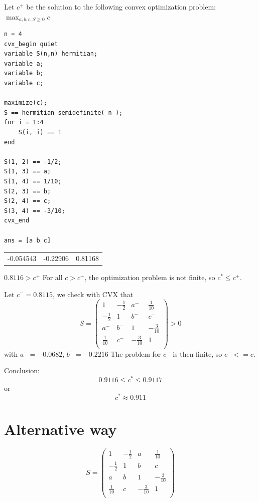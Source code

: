 \documentclass[11pt]{article}
\begin{document}
Let \(c^+\) be the solution to the following convex optimization problem:
\(\max_{a, b, c, S \ge 0} c\)

\begin{verbatim}
n = 4
cvx_begin quiet
variable S(n,n) hermitian; 
variable a;
variable b;
variable c;

maximize(c);
S == hermitian_semidefinite( n );
for i = 1:4
    S(i, i) == 1 
end

S(1, 2) == -1/2;
S(1, 3) == a;
S(1, 4) == 1/10;
S(2, 3) == b;
S(2, 4) == c;
S(3, 4) == -3/10;
cvx_end

ans = [a b c]
\end{verbatim}

\begin{center}
\begin{tabular}{rrr}
-0.054543 & -0.22906 & 0.81168\\
\end{tabular}
\end{center}



\(0.8116 > c^+\)
For all \(c > c^+\), the optimization problem is not finite, so \(c^* \le c^+\).

Let \(c^- = 0.8115\), we check with CVX that
\[S =\begin{pmatrix}
 1          & -\frac12 & a^-           & \frac1{10}  \\
 -\frac12   & 1        & b^-           & c^-           \\
 a^-          & b^-        & 1           & -\frac3{10} \\
 \frac1{10} & c^-        & -\frac3{10} & 1           \\
\end{pmatrix}
 > 0
\]
with \(a^- = -0.0682\), \(b^- = -0.2216\)
The problem for \(c^-\) is then finite, so \(c^- <= c\).

Conclusion: 
$$0.9116 \le c^* \le 0.9117$$
or
$$c^* \approx 0.911$$

\section{Alternative way}
\label{sec:orgheadline2}

\[ S = \begin{pmatrix}
 1          & -\frac12 & a           & \frac1{10}  \\
 -\frac12   & 1        & b           & c           \\
 a          & b        & 1           & -\frac3{10} \\
 \frac1{10} & c        & -\frac3{10} & 1           \\
\end{pmatrix}\]
\end{document}
